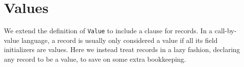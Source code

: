\begin{fence}
\begin{code}%
\>[0]\AgdaSpace{}%
\AgdaSymbol{:}\AgdaSpace{}%
\AgdaSpace{}%
\AgdaSpace{}%
\AgdaSpace{}%
\AgdaSpace{}%
\<%
\\
\>[0]\AgdaSpace{}%
\AgdaSpace{}%
%
\>[21]\AgdaSymbol{=}%
\>[24]\<%
\\
\>[0]\AgdaSpace{}%
\AgdaSpace{}%
\AgdaSymbol{(}\AgdaSpace{}%
\AgdaSymbol{)}\AgdaSpace{}%
\AgdaSymbol{=}%
\>[24]\AgdaSpace{}%
\<%
\\
%
\\[\AgdaEmptyExtraSkip]%
\>[0]\AgdaOperator{\AgdaFunction{\AgdaUnderscore{}[\AgdaUnderscore{}]}}\AgdaSpace{}%
\AgdaSymbol{:}\AgdaSpace{}%
\AgdaSpace{}%
\AgdaSpace{}%
\AgdaSpace{}%
\AgdaSpace{}%
\<%
\\
\>[0]\AgdaOperator{\AgdaFunction{\AgdaUnderscore{}[\AgdaUnderscore{}]}}\AgdaSpace{}%
\AgdaSpace{}%
\AgdaSpace{}%
\AgdaSymbol{=}%
\>[12]\AgdaSpace{}%
\AgdaSymbol{(}\AgdaSpace{}%
\AgdaSymbol{)}\AgdaSpace{}%
\<%
\end{code}
\end{fence}

\hypertarget{values}{%
\section{Values}\label{values}}

We extend the definition of \texttt{Value} to include a clause for
records. In a call-by-value language, a record is usually only
considered a value if all its field initializers are values. Here we
instead treat records in a lazy fashion, declaring any record to be a
value, to save on some extra bookkeeping.

